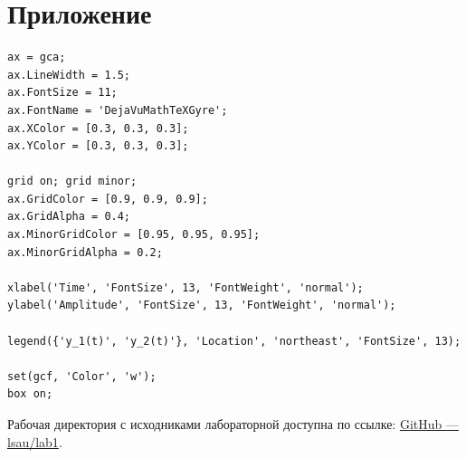 \documentclass[a4paper,12pt]{article}
\begin{document}
	
	
	\newpage
	\section{Приложение}
	
	\begin{lstlisting}[caption={Общие настройки графиков}]
ax = gca;
ax.LineWidth = 1.5;          
ax.FontSize = 11;             
ax.FontName = 'DejaVuMathTeXGyre'; 
ax.XColor = [0.3, 0.3, 0.3]; 
ax.YColor = [0.3, 0.3, 0.3]; 

grid on; grid minor;
ax.GridColor = [0.9, 0.9, 0.9];         
ax.GridAlpha = 0.4;                     
ax.MinorGridColor = [0.95, 0.95, 0.95]; 
ax.MinorGridAlpha = 0.2;               

xlabel('Time', 'FontSize', 13, 'FontWeight', 'normal');
ylabel('Amplitude', 'FontSize', 13, 'FontWeight', 'normal');

legend({'y_1(t)', 'y_2(t)'}, 'Location', 'northeast', 'FontSize', 13);

set(gcf, 'Color', 'w');
box on;

	\end{lstlisting}
	
\noindent
Рабочая директория с исходниками лабораторной доступна по ссылке: \href{https://github.com/decadeos/ITMO/tree/master/3_course/lsau/lab1}{GitHub — lsau/lab1}.


	
\end{document}
